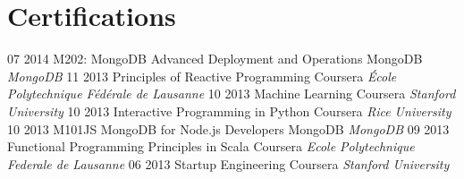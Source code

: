 \documentclass[]{cv}
\begin{document}
\section{Certifications}
\begin{entrylist}
  \entry
    {07 2014} 
    {M202: MongoDB Advanced Deployment and Operations}
    {MongoDB}
    {\emph{MongoDB}}
  \entry
    {11 2013}
    {Principles of Reactive Programming}
    {Coursera}
    {\emph{École Polytechnique Fédérale de Lausanne}}
  \entry
    {10 2013}
    {Machine Learning} 
    {Coursera}
    {\emph{Stanford University}}
  \entry
    {10 2013}
    {Interactive Programming in Python}
    {Coursera}
    {\emph{Rice University}}
  \entry
    {10 2013}
    {M101JS MongoDB for Node.js Developers}
    {MongoDB}
    {\emph{MongoDB}}
  \entry
    {09 2013}
    {Functional Programming Principles in Scala}
    {Coursera}
    {\emph{Ecole Polytechnique Federale de Lausanne}}
  \entry
    {06 2013}
    {Startup Engineering}
    {Coursera}
    {\emph{Stanford University}}
\end{entrylist}
\end{document}
